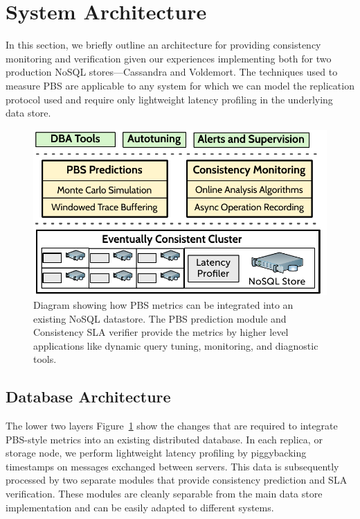 \section{System Architecture}
\label{sec:architecture}

In this section, we briefly outline an architecture for providing
consistency monitoring and verification given our experiences
implementing both for two production NoSQL stores---Cassandra and
Voldemort. The techniques used to measure PBS are applicable to any
system for which we can model the replication protocol used and
require only lightweight latency profiling in the underlying data
store.


\begin{figure}
\centering
\includegraphics[width=\columnwidth]{figs/cluster-arch.pdf}
\caption{Diagram showing how PBS metrics can be integrated into an
  existing NoSQL datastore. The PBS prediction module and Consistency
  SLA verifier provide the metrics by higher level applications like
  dynamic query tuning, monitoring, and diagnostic tools.}
\label{fig:pbs-sys-arch}
\end{figure}


\subsection{Database Architecture}
\label{sec:dbarch}

The lower two layers Figure~\ref{fig:pbs-sys-arch} show the changes
that are required to integrate PBS-style metrics into an existing
distributed database. In each replica, or storage node, we perform
lightweight latency profiling by piggybacking timestamps on messages
exchanged between servers. This data is subsequently processed by two
separate modules that provide consistency prediction and SLA
verification. These modules are cleanly separable from the main data
store implementation and can be easily adapted to different systems.\\

